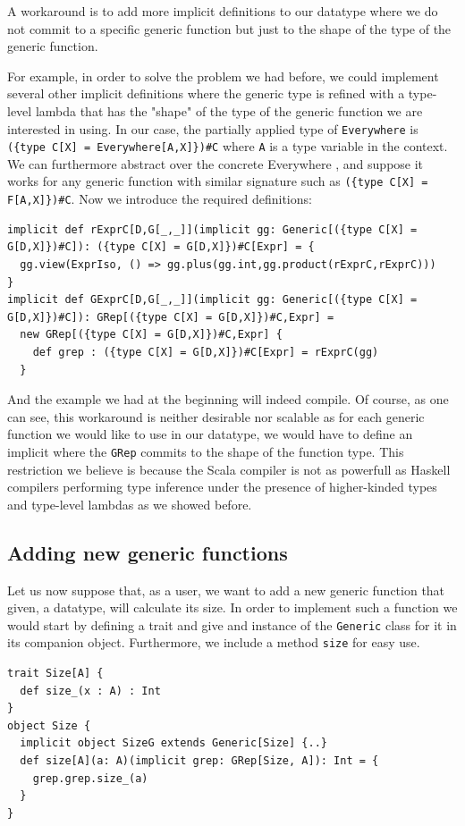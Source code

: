 \documentclass[a4paper]{article}
\begin{document}
A workaround is to add more implicit definitions to our datatype where we do not commit to a specific generic function but just to the shape of the type of the 
generic function.

For example, in order to solve the problem we had before, we could implement several other implicit definitions where the generic type is refined with a type-level lambda that has the "shape" of the type of the generic function we are interested in using.
In our case, the partially applied type of \lstinline[basicstyle=\ttfamily\color{white},style=scala]|Everywhere| is \lstinline[basicstyle=\ttfamily\color{white},style=scala]|({type C[X] = Everywhere[A,X]})#C| where \lstinline[basicstyle=\ttfamily\color{white},style=scala]|A| is a type variable in the context. We can furthermore abstract over the concrete Everywhere , and suppose it works for any generic function with similar signature such as \lstinline[basicstyle=\ttfamily\color{white},style=scala]|({type C[X] = F[A,X]})#C|.
Now we introduce the required definitions:

\begin{lstlisting}[style=scala, frame=none]
implicit def rExprC[D,G[_,_]](implicit gg: Generic[({type C[X] = G[D,X]})#C]): ({type C[X] = G[D,X]})#C[Expr] = {
  gg.view(ExprIso, () => gg.plus(gg.int,gg.product(rExprC,rExprC)))
}
implicit def GExprC[D,G[_,_]](implicit gg: Generic[({type C[X] = G[D,X]})#C]): GRep[({type C[X] = G[D,X]})#C,Expr] =
  new GRep[({type C[X] = G[D,X]})#C,Expr] {
    def grep : ({type C[X] = G[D,X]})#C[Expr] = rExprC(gg)
  }
\end{lstlisting}

And the example we had at the beginning will indeed compile.
Of course, as one can see, this workaround is neither desirable nor scalable as for each generic function we would like to use in our datatype, we would have to define an implicit where the \lstinline[basicstyle=\ttfamily\color{white},style=scala]|GRep| commits to the shape of the function type. This restriction we believe is because the Scala compiler is not as powerfull as Haskell compilers performing type inference under the presence of higher-kinded types and type-level lambdas as we showed before.

\subsection{Adding new generic functions}

Let us now suppose that, as a user, we want to add a new generic function that given, a datatype, will
calculate its size. In order to implement such a function we would start by defining a trait and give and instance of the \lstinline[basicstyle=\ttfamily\color{white},style=scala]|Generic| class for it in
its companion object. Furthermore, we include a method \lstinline[basicstyle=\ttfamily\color{white},style=scala]|size| for easy use.
\begin{lstlisting}[style=scala, frame=none]
trait Size[A] {
  def size_(x : A) : Int
}
object Size {
  implicit object SizeG extends Generic[Size] {..}
  def size[A](a: A)(implicit grep: GRep[Size, A]): Int = {
    grep.grep.size_(a)
  }
}
\end{lstlisting}
\end{document}
